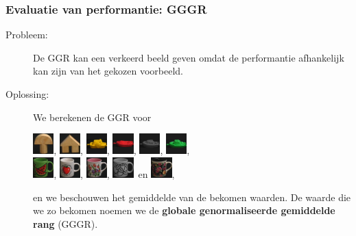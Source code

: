 \documentclass[dutch]{beamer}
\theoremstyle{definition}
\theoremstyle{remark}
\theoremstyle{example}
\begin{document}
\frame
{
  \frametitle{Evaluatie van performantie: GGGR}

  \begin{description}
  \item[Probleem:] De GGR kan een verkeerd beeld geven omdat de performantie afhankelijk
  kan zijn van het gekozen voorbeeld. 
  \item[Oplossing:]
  We berekenen de GGR voor
  \begin{center}
  \vspace{5pt}
  \includegraphics[width=0.8cm]{coil/beeld-0.eps}, 
  \includegraphics[width=0.8cm]{coil/beeld-42.eps}, 
  \includegraphics[width=0.8cm]{coil/beeld-12.eps}, 
  \includegraphics[width=0.8cm]{coil/beeld-18.eps}, 
  \includegraphics[width=0.8cm]{coil/beeld-24.eps}, 
  \includegraphics[width=0.8cm]{coil/beeld-54.eps},\\
  \vspace{5pt}
  \includegraphics[width=0.8cm]{coil/beeld-30.eps}, 
  \includegraphics[width=0.8cm]{coil/beeld-36.eps}, 
  \includegraphics[width=0.8cm]{coil/beeld-6.eps}, 
  \includegraphics[width=0.8cm]{coil/beeld-48.eps}\ en  
  \includegraphics[width=0.8cm]{coil/beeld-60.eps}, 
  \end{center}
  en we beschouwen het gemiddelde van de bekomen waarden. 
  De waarde die we zo bekomen noemen we de
  \textbf{globale genormaliseerde gemiddelde rang} (GGGR).
  \end{description}
}
\end{document}
